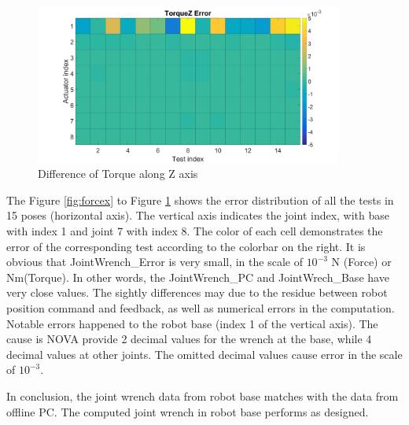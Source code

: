 \begin{figure}
	\begin{center}
		\includegraphics[width=0.9\textwidth]{./images/Result6.png}%
		\caption{Difference of Torque along Z axis}
		\label{fig:torquez}%
	\end{center}
\end{figure}

The Figure \ref{fig:forcex} to Figure \ref{fig:torquez} shows the error distribution of all the tests in 15 poses (horizontal axis). The vertical axis indicates the joint index, with base with index 1 and joint 7 with index 8. The color of each cell demonstrates the error of the corresponding test according to the colorbar on the right. It is obvious that JointWrench\_Error is very small, in the scale of $10^{-3}$ N (Force) or Nm(Torque). In other words, the JointWrench\_PC and JointWrech\_Base have very close values. The sightly differences may due to the residue between robot position command and feedback, as well as numerical errors in the computation. Notable errors happened to the robot base (index 1 of the vertical axis). The cause is NOVA provide 2 decimal values for the wrench at the base, while 4 decimal values at other joints. The omitted decimal values cause error in the scale of $10^{-3}$. 

In conclusion, the joint wrench data from robot base matches with the data from offline PC. The computed joint wrench in robot base performs as designed.
